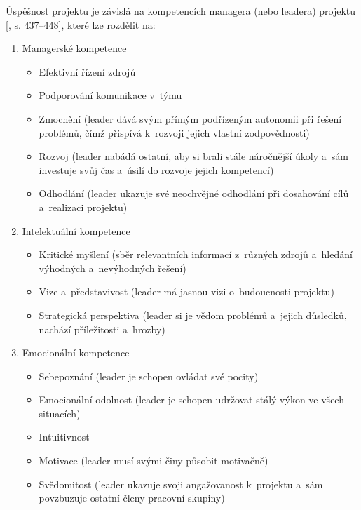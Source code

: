\documentclass[
	11pt, oneside, printed, final, palatino
	microtype,
	table,   %
	lof,     %
	lot     %
]{fithesis3}
\newcommand{\citepages}[2]{[\cite{#2}, s. #1]}
\newcommand{\mezera}{\bigskip}
\begin{document}
{\indent Úspěšnost projektu je závislá na kompetencích managera (nebo leadera) projektu \citepages{437–448}{Muller2010437}, které lze rozdělit na: 
\mezera
\begin{enumerate}
\item Managerské kompetence
\begin{itemize}
\item Efektivní řízení zdrojů
\item Podporování komunikace v~týmu
\item Zmocnění (leader dává svým přímým podřízeným autonomii při řešení problémů, čímž přispívá k~rozvoji jejich vlastní zodpovědnosti)
\item Rozvoj (leader nabádá ostatní, aby si brali stále náročnější úkoly a~sám investuje svůj čas a~úsilí do rozvoje jejich kompetencí)
\item Odhodlání (leader ukazuje své neochvějné odhodlání při dosahování cílů a~realizaci projektu)
\end{itemize}
\item Intelektuální kompetence
\begin{itemize}
\item Kritické myšlení (sběr relevantních informací z~různých zdrojů a~hledání výhodných a~nevýhodných řešení)
\item Vize a~představivost (leader má jasnou vizi o~budoucnosti projektu)
\item Strategická perspektiva (leader si je vědom problémů a~jejich důsledků, nachází příležitosti a~hrozby)
\end{itemize}
\item Emocionální kompetence
\begin{itemize}
\item Sebepoznání (leader je schopen ovládat své pocity)
\item Emocionální odolnost (leader je schopen udržovat stálý výkon ve všech situacích)
\item Intuitivnost
\item Motivace (leader musí svými činy působit motivačně)
\item Svědomitost (leader ukazuje svoji angažovanost k~projektu a~sám povzbuzuje ostatní členy pracovní skupiny)
\end{itemize}
\end{enumerate}

}
\end{document}
